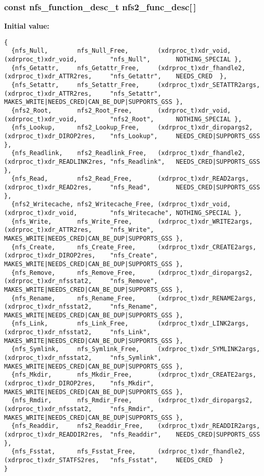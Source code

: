 \subsubsection{\setlength{\rightskip}{0pt plus 5cm}const nfs\_\-function\_\-desc\_\-t {\bf nfs2\_\-func\_\-desc}[$\,$]}\label{nfs__worker__thread_8c_a12}


{\bf Initial value:}

\footnotesize\begin{verbatim} 
{ 
  {nfs_Null,        nfs_Null_Free,        (xdrproc_t)xdr_void,         (xdrproc_t)xdr_void,         "nfs_Null",       NOTHING_SPECIAL },
  {nfs_Getattr,     nfs_Getattr_Free,     (xdrproc_t)xdr_fhandle2,     (xdrproc_t)xdr_ATTR2res,     "nfs_Getattr",    NEEDS_CRED  },
  {nfs_Setattr,     nfs_Setattr_Free,     (xdrproc_t)xdr_SETATTR2args, (xdrproc_t)xdr_ATTR2res,     "nfs_Setattr",    MAKES_WRITE|NEEDS_CRED|CAN_BE_DUP|SUPPORTS_GSS },
  {nfs2_Root,       nfs2_Root_Free,       (xdrproc_t)xdr_void,         (xdrproc_t)xdr_void,         "nfs2_Root",      NOTHING_SPECIAL },
  {nfs_Lookup,      nfs2_Lookup_Free,     (xdrproc_t)xdr_diropargs2,   (xdrproc_t)xdr_DIROP2res,    "nfs_Lookup",     NEEDS_CRED|SUPPORTS_GSS  },
  {nfs_Readlink,    nfs2_Readlink_Free,   (xdrproc_t)xdr_fhandle2,     (xdrproc_t)xdr_READLINK2res, "nfs_Readlink",   NEEDS_CRED|SUPPORTS_GSS  },
  {nfs_Read,        nfs2_Read_Free,       (xdrproc_t)xdr_READ2args,    (xdrproc_t)xdr_READ2res,     "nfs_Read",       NEEDS_CRED|SUPPORTS_GSS  },
  {nfs2_Writecache, nfs2_Writecache_Free, (xdrproc_t)xdr_void,         (xdrproc_t)xdr_void,         "nfs_Writecache", NOTHING_SPECIAL },
  {nfs_Write,       nfs_Write_Free,       (xdrproc_t)xdr_WRITE2args,   (xdrproc_t)xdr_ATTR2res,     "nfs_Write",      MAKES_WRITE|NEEDS_CRED|CAN_BE_DUP|SUPPORTS_GSS },
  {nfs_Create,      nfs_Create_Free,      (xdrproc_t)xdr_CREATE2args,  (xdrproc_t)xdr_DIROP2res,    "nfs_Create",     MAKES_WRITE|NEEDS_CRED|CAN_BE_DUP|SUPPORTS_GSS },
  {nfs_Remove,      nfs_Remove_Free,      (xdrproc_t)xdr_diropargs2,   (xdrproc_t)xdr_nfsstat2,     "nfs_Remove",     MAKES_WRITE|NEEDS_CRED|CAN_BE_DUP|SUPPORTS_GSS },
  {nfs_Rename,      nfs_Rename_Free,      (xdrproc_t)xdr_RENAME2args,  (xdrproc_t)xdr_nfsstat2,     "nfs_Rename",     MAKES_WRITE|NEEDS_CRED|CAN_BE_DUP|SUPPORTS_GSS },
  {nfs_Link,        nfs_Link_Free,        (xdrproc_t)xdr_LINK2args,    (xdrproc_t)xdr_nfsstat2,     "nfs_Link",       MAKES_WRITE|NEEDS_CRED|CAN_BE_DUP|SUPPORTS_GSS },
  {nfs_Symlink,     nfs_Symlink_Free,     (xdrproc_t)xdr_SYMLINK2args, (xdrproc_t)xdr_nfsstat2,     "nfs_Symlink",    MAKES_WRITE|NEEDS_CRED|CAN_BE_DUP|SUPPORTS_GSS },
  {nfs_Mkdir,       nfs_Mkdir_Free,       (xdrproc_t)xdr_CREATE2args,  (xdrproc_t)xdr_DIROP2res,    "nfs_Mkdir",      MAKES_WRITE|NEEDS_CRED|CAN_BE_DUP|SUPPORTS_GSS },
  {nfs_Rmdir,       nfs_Rmdir_Free,       (xdrproc_t)xdr_diropargs2,   (xdrproc_t)xdr_nfsstat2,     "nfs_Rmdir",      MAKES_WRITE|NEEDS_CRED|CAN_BE_DUP|SUPPORTS_GSS },
  {nfs_Readdir,     nfs2_Readdir_Free,    (xdrproc_t)xdr_READDIR2args, (xdrproc_t)xdr_READDIR2res,  "nfs_Readdir",    NEEDS_CRED|SUPPORTS_GSS },
  {nfs_Fsstat,      nfs_Fsstat_Free,      (xdrproc_t)xdr_fhandle2,     (xdrproc_t)xdr_STATFS2res,   "nfs_Fsstat",     NEEDS_CRED  }
}
\end{verbatim}\normalsize 


